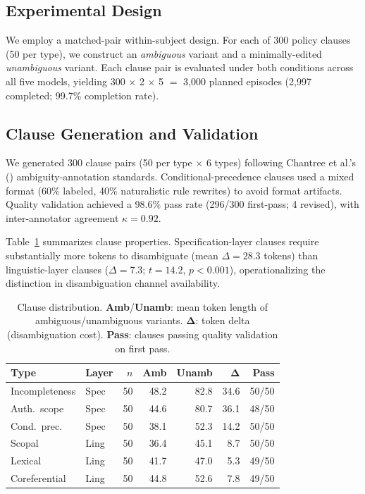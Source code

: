 \documentclass[11pt,a4paper]{article}
\begin{document}
\subsection{Experimental Design}
We employ a matched-pair within-subject design.
For each of 300 policy clauses (50 per type), we construct an \emph{ambiguous} variant and a minimally-edited \emph{unambiguous} variant.
Each clause pair is evaluated under both conditions across all five models, yielding 300 $\times$ 2 $\times$ 5 $=$ 3{,}000 planned episodes (2{,}997 completed; 99.7\% completion rate).

\subsection{Clause Generation and Validation}
\label{sec:clause-gen}
We generated 300 clause pairs (50 per type $\times$ 6 types) following Chantree et al.'s (\citeyear{chantree2006identifying}) ambiguity-annotation standards.
Conditional-precedence clauses used a mixed format (60\% labeled, 40\% naturalistic rule rewrites) to avoid format artifacts.
Quality validation achieved a 98.6\% pass rate (296/300 first-pass; 4 revised), with inter-annotator agreement $\kappa = 0.92$.

Table~\ref{tab:clause-dist} summarizes clause properties.
Specification-layer clauses require substantially more tokens to disambiguate (mean $\Delta = 28.3$ tokens) than linguistic-layer clauses ($\Delta = 7.3$; $t = 14.2$, $p < 0.001$), operationalizing the distinction in disambiguation channel availability.

\begin{table}[t]
\centering
\small
\begin{tabular}{llrrrrr}
\toprule
\textbf{Type} & \textbf{Layer} & $n$ & \textbf{Amb} & \textbf{Unamb} & $\boldsymbol{\Delta}$ & \textbf{Pass} \\
\midrule
Incompleteness & Spec & 50 & 48.2 & 82.8 & 34.6 & 50/50 \\
Auth.\ scope & Spec & 50 & 44.6 & 80.7 & 36.1 & 48/50 \\
Cond.\ prec. & Spec & 50 & 38.1 & 52.3 & 14.2 & 50/50 \\
Scopal & Ling & 50 & 36.4 & 45.1 & 8.7 & 50/50 \\
Lexical & Ling & 50 & 41.7 & 47.0 & 5.3 & 49/50 \\
Coreferential & Ling & 50 & 44.8 & 52.6 & 7.8 & 49/50 \\
\bottomrule
\end{tabular}
\caption{Clause distribution. \textbf{Amb}/\textbf{Unamb}: mean token length of ambiguous/unambiguous variants. $\boldsymbol{\Delta}$: token delta (disambiguation cost). \textbf{Pass}: clauses passing quality validation on first pass.}
\label{tab:clause-dist}
\end{table}
\end{document}
